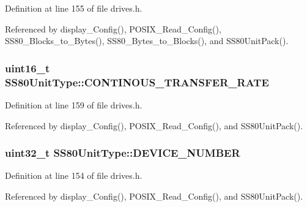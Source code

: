 Definition at line 155 of file drives.\+h.



Referenced by display\+\_\+\+Config(), P\+O\+S\+I\+X\+\_\+\+Read\+\_\+\+Config(), S\+S80\+\_\+\+Blocks\+\_\+to\+\_\+\+Bytes(), S\+S80\+\_\+\+Bytes\+\_\+to\+\_\+\+Blocks(), and S\+S80\+Unit\+Pack().

\subsubsection[{\texorpdfstring{C\+O\+N\+T\+I\+N\+O\+U\+S\+\_\+\+T\+R\+A\+N\+S\+F\+E\+R\+\_\+\+R\+A\+TE}{CONTINOUS_TRANSFER_RATE}}]{\setlength{\rightskip}{0pt plus 5cm}uint16\+\_\+t S\+S80\+Unit\+Type\+::\+C\+O\+N\+T\+I\+N\+O\+U\+S\+\_\+\+T\+R\+A\+N\+S\+F\+E\+R\+\_\+\+R\+A\+TE}\hypertarget{structSS80UnitType_a0486673977da185f2f69aaff378f81a2}{}\label{structSS80UnitType_a0486673977da185f2f69aaff378f81a2}


Definition at line 159 of file drives.\+h.



Referenced by display\+\_\+\+Config(), P\+O\+S\+I\+X\+\_\+\+Read\+\_\+\+Config(), and S\+S80\+Unit\+Pack().

\subsubsection[{\texorpdfstring{D\+E\+V\+I\+C\+E\+\_\+\+N\+U\+M\+B\+ER}{DEVICE_NUMBER}}]{\setlength{\rightskip}{0pt plus 5cm}uint32\+\_\+t S\+S80\+Unit\+Type\+::\+D\+E\+V\+I\+C\+E\+\_\+\+N\+U\+M\+B\+ER}\hypertarget{structSS80UnitType_a69cad18aab93449fbd91445c4ba62928}{}\label{structSS80UnitType_a69cad18aab93449fbd91445c4ba62928}


Definition at line 154 of file drives.\+h.



Referenced by display\+\_\+\+Config(), P\+O\+S\+I\+X\+\_\+\+Read\+\_\+\+Config(), and S\+S80\+Unit\+Pack().


